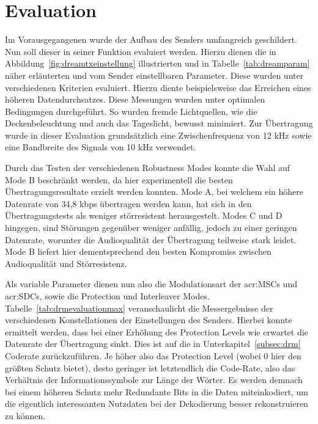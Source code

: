 
\chapter{Evaluation}
\label{sec:evaluation}
Im Vorausgegangenen wurde der Aufbau des Senders umfangreich geschildert. Nun soll dieser in seiner Funktion evaluiert werden. Hierzu dienen die in Abbildung~\ref{fig:dreamtxeinstellung} illustrierten und in Tabelle~\ref{tab:dreamparam} näher erläuterten und vom Sender einstellbaren Parameter. Diese wurden unter verschiedenen Kriterien evaluiert. Hierzu diente beispielsweise das Erreichen eines höheren Datendurchsatzes. Diese Messungen wurden unter optimalen Bedingungen durchgeführt. So wurden fremde Lichtquellen, wie die Deckenbeleuchtung und auch das Tageslicht, bewusst minimiert. Zur Übertragung wurde in dieser Evaluation grundsätzlich eine Zwischenfrequenz von 12 kHz sowie eine Bandbreite des Signals von 10 kHz verwendet.

Durch das Testen der verschiedenen Robustness Modes konnte die Wahl auf Mode B beschränkt werden, da hier experimentell die besten Übertragungsresultate erzielt werden konnten. Mode A, bei welchem ein höhere Datenrate von 34,8 kbps übertragen werden kann, hat sich in den Übertragungstests als weniger störresistent herausgestelt. Modes C und D hingegen, sind Störungen gegenüber weniger anfällig, jedoch zu einer geringen Datenrate, worunter die Audioqualität der Übertragung teilweise stark leidet. Mode B liefert hier dementsprechend den besten Kompromiss zwischen Audioqualität und Störresistenz.

 Als variable Parameter dienen nun also die Modulationsart der \gls{acr:MSC}s und \gls{acr:SDC}s, sowie die Protection und Interleaver Modes. Tabelle~\ref{tab:drmevaluationmax} veranschaulicht die Messergebnisse der verschiedenen Konstellationen der Einstellungen des Senders. Hierbei konnte ermittelt werden, dass bei einer Erhöhung des Protection Levels wie erwartet die Datenrate der Übertragung sinkt. Dies ist auf die in Unterkapitel~\ref{subsec:drm} Coderate zurückzuführen. Je höher also das Protection Level (wobei 0 hier den größten Schutz bietet), desto geringer ist letztendlich die Code-Rate, also das Verhältnis der Informationssymbole zur Länge der Wörter. Es werden demnach bei einem höheren Schutz mehr Redundante Bits in die Daten miteinkodiert, um die eigentlich interessanten Nutzdaten bei der Dekodierung besser rekonstruieren zu können. 




